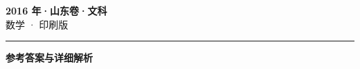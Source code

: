 \documentclass[zihao=5, a4paper]{ctexart}
\begin{document}
\begin{center}
  {\Large\bfseries 2016 年·山东卷·文科}\\[4pt]
  {\large 数学 · 印刷版}
\end{center}
\medskip
{}

\par\bigskip\hrule\bigskip
{}
\begin{center}{\large\bfseries 参考答案与详细解析}\end{center}
\smallskip

\end{document}
